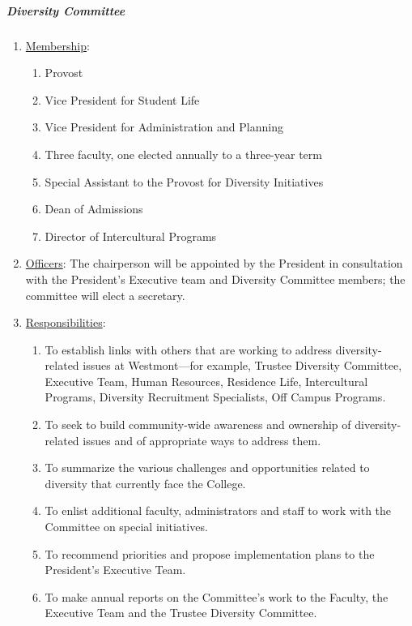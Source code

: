 				\subparagraph{Diversity Committee}
					\begin{enumerate}[label=\alph*)]
						\item{\underline{Membership}:
							\begin{enumerate}[label=\arabic*)]
								\item{Provost}
								\item{Vice President for Student Life}
								\item{Vice President for Administration and Planning}
								\item{Three faculty, one elected annually to a three-year term}
								\item{Special Assistant to the Provost for Diversity Initiatives}
								\item{Dean of Admissions}
								\item{Director of Intercultural Programs}
							\end{enumerate}
						}
						\item{\underline{Officers}:
							The chairperson will be appointed by the President in consultation with the President's Executive team and Diversity Committee members; the committee will elect a secretary.}
						\item{\underline{Responsibilities}:
							\begin{enumerate}[label=\arabic*)]
								\item{To establish links with others that are working to address diversity-related issues at Westmont---for example, Trustee Diversity Committee, Executive Team, Human Resources, Residence Life, Intercultural Programs, Diversity Recruitment Specialists, Off Campus Programs.}
								\item{To seek to build community-wide awareness and ownership of diversity-related issues and of appropriate ways to address them.}
								\item{To summarize the various challenges and opportunities related to diversity that currently face the College.}
								\item{To enlist additional faculty, administrators and staff to work with the Committee on special initiatives.}
								\item{To recommend priorities and propose implementation plans to the President's Executive Team.}
								\item{To make annual reports on the Committee's work to the Faculty, the Executive Team and the Trustee Diversity Committee.}
							\end{enumerate}
						}
					\end{enumerate}
